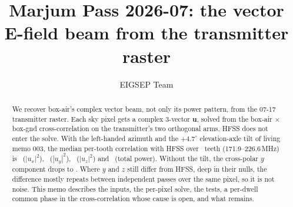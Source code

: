\documentclass{aastex631}
\newcommand{\vu}{\mathbf{u}}
\begin{document}
\title{Marjum Pass 2026-07: the vector E-field beam from the transmitter raster}

\author{EIGSEP Team}

\begin{abstract}
We recover box-air's complex vector beam, not only its power pattern, from the 07-17 transmitter raster. Each
sky pixel gets a complex 3-vector $\vu$, solved from the box-air $\times$ box-gnd cross-correlation on the
transmitter's two orthogonal arms. HFSS does not enter the solve. With the left-handed azimuth and the
$+4.7^\circ$ elevation-axle tilt of living memo 003, the median per-tooth correlation with HFSS over
\nTeeth\ teeth (171.9--226.6\,MHz) is \medXL\ ($|u_x|^2$), \medYL\ ($|u_y|^2$), \medZL\ ($|u_z|^2$) and
\medPowerL\ (total power). Without the tilt, the cross-polar $y$ component drops to \medYLzero. Where $y$
and $z$ still differ from HFSS, deep in their nulls, the difference mostly repeats between independent passes
over the same pixel, so it is not noise. This memo describes the inputs, the per-pixel solve, the tests, a
per-dwell common phase in the cross-correlation whose cause is open, and what remains.
\end{abstract}
\end{document}
